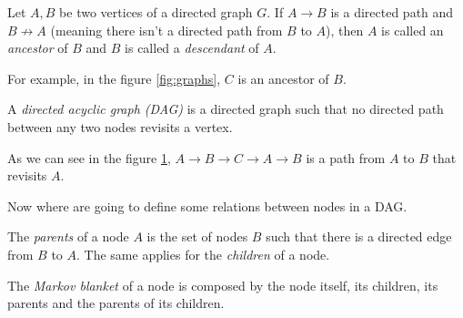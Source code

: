 \documentclass[oneside,openright,titlepage,numbers=noenddot,openany,headinclude,footinclude=true,
  cleardoublepage=empty,abstractoff,BCOR=5mm,paper=a4,fontsize=12pt]{scrreprt}
\begin{document}
\begin{definition}
Let \(A,B\) be two vertices of a directed graph \(G\). If \(A \to B\) is a
directed path and \(B \not \to A\) (meaning there isn't a directed path from
\(B\) to \(A\)), then \(A\) is called an \emph{ancestor} of \(B\) and \(B\) is called a \emph{descendant} of \(A\).
\end{definition}

For example, in the figure \ref{fig:graphs}, \(C\) is an ancestor of \(B\).

\begin{definition}
A \emph{directed acyclic graph (DAG)} is a directed graph such that no directed path between any two nodes revisits a vertex.
\end{definition}


\begin{figure}[h]
\centering
{}
\label{fig:not_dag}
\end{figure}

As we can see in the figure \ref{fig:not_dag}, \(A \to B \to C \to A \to B\) is a
path from \(A\) to \(B\) that revisits \(A\).

Now where are going to define some relations between nodes in a DAG.

\begin{definition}
The \emph{parents} of a node \(A\) is the set of nodes \(B\) such that there is a
directed edge from \(B\) to \(A\). The same applies for the \emph{children} of a node.

The \emph{Markov blanket} of a node is composed by the node itself, its children, its parents and the parents
of its children.
\end{definition}


\begin{figure}[h]
\centering
{}
\label{fig:relations}
\end{figure}
\end{document}

